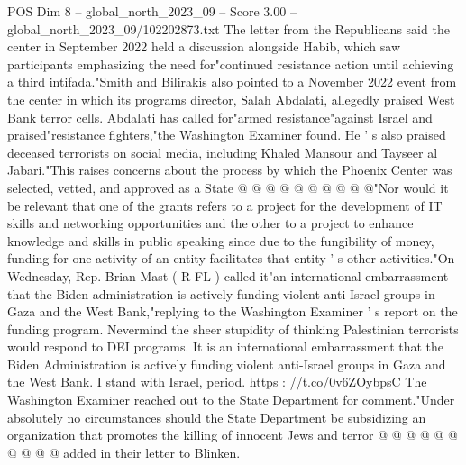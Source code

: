 \begin{textsample}{POS Dim 8 – global\_north\_2023\_09 – Score 3.00 – global\_north\_2023\_09/102202873.txt}
The letter from the Republicans said the center in September 2022 held a discussion alongside Habib, which saw participants emphasizing the need for"continued resistance action until achieving a third intifada."Smith and Bilirakis also pointed to a November 2022 event from the center in which its programs director, Salah Abdalati, allegedly praised West Bank terror cells.
Abdalati has called for"armed resistance"against Israel and praised"resistance fighters,"the Washington Examiner found.
He ' s also praised deceased terrorists on social media, including Khaled Mansour and Tayseer al Jabari."This raises concerns about the process by which the Phoenix Center was selected, vetted, and approved as a State @ @ @ @ @ @ @ @ @ @"Nor would it be relevant that one of the grants refers to a project for the development of IT skills and networking opportunities and the other to a project to enhance knowledge and skills in public speaking since due to the fungibility of money, funding for one activity of an entity facilitates that entity ' s other activities."On Wednesday, Rep.
Brian Mast ( R-FL ) called it"an international embarrassment that the Biden administration is actively funding violent anti-Israel groups in Gaza and the West Bank,"replying to the Washington Examiner ' s report on the funding program.
Nevermind the sheer stupidity of thinking Palestinian terrorists would respond to DEI programs.
It is an international embarrassment that the Biden Administration is actively funding violent anti-Israel groups in Gaza and the West Bank.
I stand with Israel, period. https : //t.co/0v6ZOybpsC The Washington Examiner reached out to the State Department for comment."Under absolutely no circumstances should the State Department be subsidizing an organization that promotes the killing of innocent Jews and terror @ @ @ @ @ @ @ @ @ @ added in their letter to Blinken.

\end{textsample}
